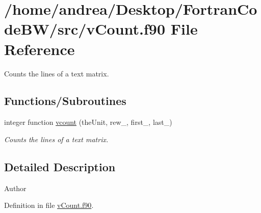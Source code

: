 \hypertarget{v_count_8f90}{\section{/home/andrea/\-Desktop/\-Fortran\-Code\-B\-W/src/v\-Count.f90 File Reference}
\label{v_count_8f90}
}


Counts the lines of a text matrix.  


\subsection*{Functions/\-Subroutines}
\begin{DoxyCompactItemize}
\item 
integer function \hyperlink{v_count_8f90_a64dfa04178ad3ed3519dbac3c8540a81}{vcount} (the\-Unit, rew\-\_\-, first\-\_\-, last\-\_\-)
\begin{DoxyCompactList}\small\item\em Counts the lines of a text matrix. \end{DoxyCompactList}\end{DoxyCompactItemize}


\subsection{Detailed Description}
\begin{DoxyAuthor}{Author}

\end{DoxyAuthor}


Definition in file \hyperlink{v_count_8f90_source}{v\-Count.\-f90}.



